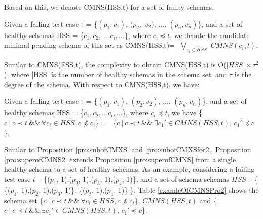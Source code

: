 \documentclass{sig-alternate-05-2015}
\begin{document}
{{Based on this, we denote CMNS(HSS,t) for a set of faulty schemas.


\begin{definition}
Given a failing test case t = \{$(p_{1}, v_{1})$, $(p_{2}, $ $v_{2})$, ..., $(p_{n}, v_{n})$\}, and a set of healthy schemas HSS = \{$c_{1} , c_{2},$ $  ...c_{i}, ...$\}, where $ c_{i} \preceq t$, we denote the candidate minimal pending schema of this set as CMNS(HSS,t)= $ $ $\bigvee_{c_{i}\in HSS}$ $ CMNS(c_{i}, t)$.
\end{definition}

Similar to CMXS(FSS,t), the complexity to obtain CMNS(HSS,t) is O($|HSS| \times \tau^{2}$), where |HSS| is the number of healthy schemas in the schema set, and $\tau$ is the degree of the schema. With respect to CMNS(HSS,t), we have:

\begin{proposition}\label{pro:superofCMNS2}
Given a failing test case t = \{$(p_{1}, v_{1})$, $(p_{2}, v_{2})$, ..., $(p_{n}, v_{n})$\}, and a set of healthy schemas HSS = \{$c_{1} , c_{2}, ... c_{i}, ...$\}, where $ c_{i} \preceq t$,  we have \{$c\ |\ c \prec t\ \&\&\ \forall c_{i} \in HSS, c \npreceq c_{i} $\} $=$  \{$ c\ |\ c \prec t \ \&\& \ \exists c_{1}' \in CMNS(HSS, t)$, $c_{1}' \preceq c$\}.
\end{proposition}

Similar to Proposition \ref{pro:subofCMXS} and \ref{pro:subofCMXSfor2},  Proposition \ref{pro:superofCMNS2} extends Proposition \ref{pro:superofCMNS} from a single healthy schema to a set of healthy schemas. As an example, considering a failing test case $t$ -- \{($p_{1}$, 1),($p_{2}$, 1),($p_{3}$, 1),($p_{4}$, 1)\}, and a set of schema schemas  $HSS$ -- \{ \{($p_{1}$, 1),($p_{2}$, 1),($p_{3}$, 1)\},  \{($p_{3}$, 1),($p_{4}$, 1)\} \}. Table \ref{examleOfCMNSPro2} shows the schema set \{$c\ |\ c \prec t\ \&\&\ \forall c_{i} \in HSS, c \npreceq c_{i} $\}, $CMNS(HSS, t)$ and \{$ c\ |\ c \prec t \ \&\& \ \exists c_{1}' \in CMNS(HSS, t)$, $c_{1}' \preceq c$\}.


}}
\end{document}
